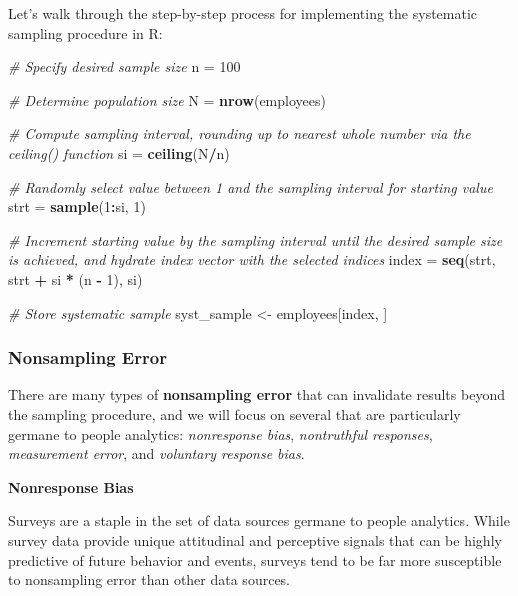 \documentclass[]{book}
\newenvironment{Shaded}{\begin{snugshade}}{\end{snugshade}}
\newcommand{\CommentTok}[1]{\textcolor[rgb]{0.56,0.35,0.01}{\textit{#1}}}
\newcommand{\DecValTok}[1]{\textcolor[rgb]{0.00,0.00,0.81}{#1}}
\newcommand{\KeywordTok}[1]{\textcolor[rgb]{0.13,0.29,0.53}{\textbf{#1}}}
\newcommand{\NormalTok}[1]{#1}
\newcommand{\OperatorTok}[1]{\textcolor[rgb]{0.81,0.36,0.00}{\textbf{#1}}}
\newcommand{\StringTok}[1]{\textcolor[rgb]{0.31,0.60,0.02}{#1}}
\begin{document}
Let's walk through the step-by-step process for implementing the systematic sampling procedure in R:

\begin{Shaded}
\begin{Highlighting}[]
\CommentTok{# Specify desired sample size}
\NormalTok{n =}\StringTok{ }\DecValTok{100}

\CommentTok{# Determine population size}
\NormalTok{N =}\StringTok{ }\KeywordTok{nrow}\NormalTok{(employees)}

\CommentTok{# Compute sampling interval, rounding up to nearest whole number via the ceiling() function}
\NormalTok{si =}\StringTok{ }\KeywordTok{ceiling}\NormalTok{(N}\OperatorTok{/}\NormalTok{n)}

\CommentTok{# Randomly select value between 1 and the sampling interval for starting value}
\NormalTok{strt =}\StringTok{ }\KeywordTok{sample}\NormalTok{(}\DecValTok{1}\OperatorTok{:}\NormalTok{si, }\DecValTok{1}\NormalTok{)}

\CommentTok{# Increment starting value by the sampling interval until the desired sample size is achieved, and hydrate index vector with the selected indices}
\NormalTok{index =}\StringTok{ }\KeywordTok{seq}\NormalTok{(strt, strt }\OperatorTok{+}\StringTok{ }\NormalTok{si }\OperatorTok{*}\StringTok{ }\NormalTok{(n }\OperatorTok{-}\StringTok{ }\DecValTok{1}\NormalTok{), si)}

\CommentTok{# Store systematic sample}
\NormalTok{syst_sample <-}\StringTok{ }\NormalTok{employees[index, ]}
\end{Highlighting}
\end{Shaded}

\hypertarget{nonsampling-error}{%
\subsubsection{Nonsampling Error}\label{nonsampling-error}}

There are many types of \textbf{nonsampling error} that can invalidate results beyond the sampling procedure, and we will focus on several that are particularly germane to people analytics: \emph{nonresponse bias}, \emph{nontruthful responses}, \emph{measurement error}, and \emph{voluntary response bias}.

\textbf{Nonresponse Bias}

Surveys are a staple in the set of data sources germane to people analytics. While survey data provide unique attitudinal and perceptive signals that can be highly predictive of future behavior and events, surveys tend to be far more susceptible to nonsampling error than other data sources.
\end{document}
